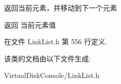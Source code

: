 返回当前元素，并移动到下一个元素 

\begin{DoxyReturn}{返回}
当前元素值 
\end{DoxyReturn}


在文件 Link\-List.\-h 第 556 行定义.



该类的文档由以下文件生成\-:\begin{DoxyCompactItemize}
\item 
Virtual\-Disk\-Console/Link\-List.\-h\end{DoxyCompactItemize}
